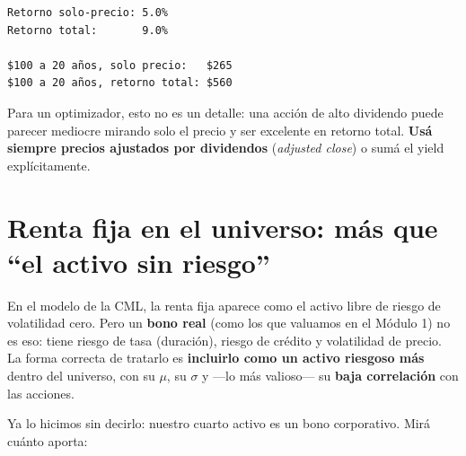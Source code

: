 \documentclass[
  spanish,
  letterpaper,
  DIV=11,
  numbers=noendperiod]{scrreprt}
\begin{document}
\begin{verbatim}
Retorno solo-precio: 5.0%
Retorno total:       9.0%

$100 a 20 años, solo precio:   $265
$100 a 20 años, retorno total: $560
\end{verbatim}

Para un optimizador, esto no es un detalle: una acción de alto dividendo
puede parecer mediocre mirando solo el precio y ser excelente en retorno
total. \textbf{Usá siempre precios ajustados por dividendos}
(\emph{adjusted close}) o sumá el yield explícitamente.

\section{Renta fija en el universo: más que ``el activo sin
riesgo''}\label{renta-fija-en-el-universo-muxe1s-que-el-activo-sin-riesgo}

En el modelo de la CML, la renta fija aparece como el activo libre de
riesgo de volatilidad cero. Pero un \textbf{bono real} (como los que
valuamos en el Módulo 1) no es eso: tiene riesgo de tasa (duración),
riesgo de crédito y volatilidad de precio. La forma correcta de tratarlo
es \textbf{incluirlo como un activo riesgoso más} dentro del universo,
con su \(\mu\), su \(\sigma\) y ---lo más valioso--- su \textbf{baja
correlación} con las acciones.

Ya lo hicimos sin decirlo: nuestro cuarto activo es un bono corporativo.
Mirá cuánto aporta:
\end{document}
